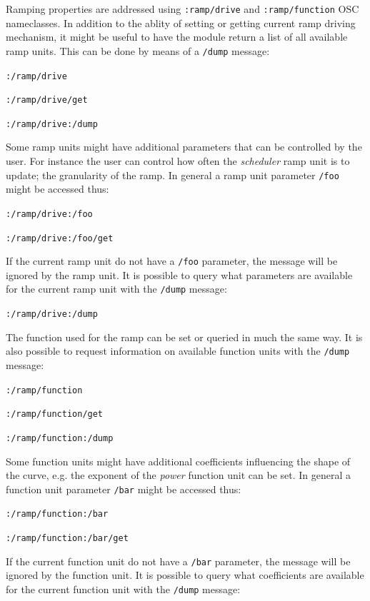 \documentclass{NIME-alternate}
\begin{document}
\begin{Abstract}
Ramping properties are addressed using \texttt{:ramp/drive} and \texttt{:ramp/function} OSC nameclasses. In addition to the ablity of setting or getting current ramp driving mechanism, it might be useful to have the module return a list of all available ramp units. This can be done by means of a \texttt{/dump} message:

\texttt{:/ramp/drive}

\texttt{:/ramp/drive/get}

\texttt{:/ramp/drive:/dump}

Some ramp units might have additional parameters that can be controlled by the user. For instance the user can control how often the \emph{scheduler} ramp unit is to update; the granularity of the ramp.  In general a ramp unit parameter \texttt{/foo} might be accessed thus:


\texttt{:/ramp/drive:/foo}

\texttt{:/ramp/drive:/foo/get}

If the current ramp unit do not have a \texttt{/foo} parameter, the message will be ignored by the ramp unit. It is possible to query what parameters are available for the current ramp unit with the \texttt{/dump} message:

\texttt{:/ramp/drive:/dump}

The function used for the ramp can be set or queried in much the same way. It is also possible to request information on available function units with the \texttt{/dump} message:

\texttt{:/ramp/function}

\texttt{:/ramp/function/get}

\texttt{:/ramp/function:/dump}

Some function units might have additional coefficients influencing the shape of the curve, e.g. the exponent of the \emph{power} function unit can be set. In general a function unit parameter \texttt{/bar} might be accessed thus:

\texttt{:/ramp/function:/bar}

\texttt{:/ramp/function:/bar/get}

If the current function unit do not have a \texttt{/bar} parameter, the message will be ignored by the function unit. It is possible to query what coefficients are available for the current function unit with the \texttt{/dump} message:


\end{Abstract}
\end{document}
